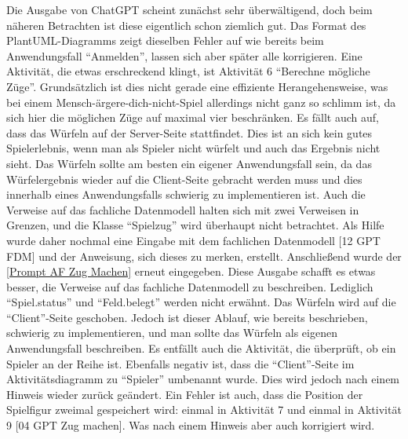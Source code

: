 Die Ausgabe von ChatGPT scheint zunächst sehr überwältigend, doch beim näheren Betrachten ist diese eigentlich schon ziemlich gut. Das 
Format des PlantUML-Diagramms zeigt dieselben Fehler auf wie bereits beim Anwendungsfall ``Anmelden'', lassen sich aber später alle 
korrigieren. Eine Aktivität, die etwas erschreckend klingt, ist Aktivität 6 ``Berechne mögliche Züge''. Grundsätzlich ist dies nicht 
gerade eine effiziente Herangehensweise, was bei einem Mensch-ärgere-dich-nicht-Spiel allerdings nicht ganz so schlimm ist, da sich 
hier die möglichen Züge auf maximal vier beschränken. Es fällt auch auf, dass das Würfeln auf der Server-Seite stattfindet. Dies ist 
an sich kein gutes Spielerlebnis, wenn man als Spieler nicht würfelt und auch das Ergebnis nicht sieht. Das Würfeln sollte am besten ein eigener Anwendungsfall sein, da 
das Würfelergebnis wieder auf die Client-Seite gebracht werden muss und dies innerhalb eines Anwendungsfalls schwierig zu implementieren 
ist. Auch die Verweise auf das fachliche Datenmodell halten sich mit zwei Verweisen in Grenzen, und die Klasse ``Spielzug'' wird überhaupt 
nicht betrachtet. Als Hilfe wurde daher nochmal eine Eingabe mit dem fachlichen Datenmodell [12 GPT FDM] und der Anweisung, sich dieses 
zu merken, erstellt. Anschließend wurde der \autoref{Prompt AF Zug Machen} erneut eingegeben. Diese Ausgabe schafft es etwas besser, 
die Verweise auf das fachliche Datenmodell zu beschreiben. Lediglich ``Spiel.status'' und ``Feld.belegt'' werden nicht erwähnt. Das Würfeln 
wird auf die ``Client''-Seite geschoben. Jedoch ist dieser Ablauf, wie bereits beschrieben, schwierig zu implementieren, und man sollte das 
Würfeln als eigenen Anwendungsfall beschreiben. Es entfällt auch die Aktivität, die überprüft, ob ein Spieler an der Reihe ist. Ebenfalls 
negativ ist, dass die ``Client''-Seite im Aktivitätsdiagramm zu ``Spieler'' umbenannt wurde. Dies wird jedoch nach einem Hinweis wieder zurück 
geändert. Ein Fehler ist auch, dass die Position der Spielfigur zweimal gespeichert wird: einmal in Aktivität 7 und einmal in Aktivität 9 
[04 GPT Zug machen]. Was nach einem Hinweis aber auch korrigiert wird.

